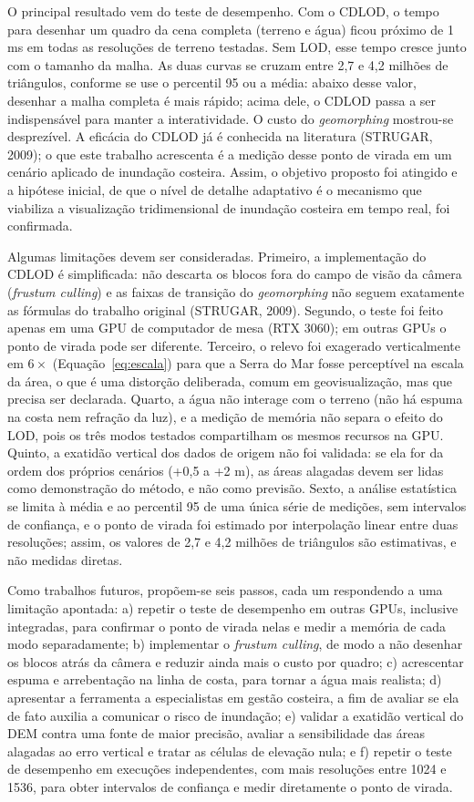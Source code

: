\documentclass[conference]{IEEEtran}
\begin{document}
O principal resultado vem do teste de desempenho. Com o CDLOD, o tempo para
desenhar um quadro da cena completa (terreno e água) ficou próximo de 1 ms
em todas as resoluções de terreno testadas. Sem LOD, esse tempo cresce
junto com o tamanho da malha. As duas curvas se cruzam entre 2,7 e 4,2
milhões de triângulos, conforme se use o percentil 95 ou a média: abaixo
desse valor, desenhar a malha completa é mais rápido; acima dele, o CDLOD
passa a ser indispensável para manter a interatividade. O custo do \emph{geomorphing} mostrou-se
desprezível. A eficácia do CDLOD já é conhecida na literatura (STRUGAR,
2009); o que este trabalho acrescenta é a medição desse ponto de virada em
um cenário aplicado de inundação costeira. Assim, o objetivo proposto foi
atingido e a hipótese inicial, de que o nível de detalhe adaptativo é o
mecanismo que viabiliza a visualização tridimensional de inundação costeira
em tempo real, foi confirmada.

Algumas limitações devem ser consideradas. Primeiro, a implementação do
CDLOD é simplificada: não descarta os blocos fora do campo de visão da
câmera (\emph{frustum culling}) e as faixas de transição do
\emph{geomorphing} não seguem exatamente as fórmulas do trabalho original
(STRUGAR, 2009). Segundo, o teste foi feito apenas em uma GPU de computador
de mesa (RTX 3060); em outras GPUs o ponto de virada pode ser diferente. Terceiro, o relevo foi exagerado verticalmente em $6\times$
(Equação~\eqref{eq:escala}) para que a Serra do Mar fosse perceptível na
escala da área, o que é uma distorção deliberada, comum em geovisualização,
mas que precisa ser declarada. Quarto, a água não interage com o terreno
(não há espuma na costa nem refração da luz), e a medição de memória não
separa o efeito do LOD, pois os três modos testados compartilham os mesmos
recursos na GPU. Quinto, a exatidão vertical dos dados de origem não foi
validada: se ela for da ordem dos próprios cenários (+0,5 a +2 m), as áreas
alagadas devem ser lidas como demonstração do método, e não como previsão.
Sexto, a análise estatística se limita à média e ao percentil 95 de uma única
série de medições, sem intervalos de confiança, e o ponto de virada foi
estimado por interpolação linear entre duas resoluções; assim, os valores de
2,7 e 4,2 milhões de triângulos são estimativas, e não medidas diretas.

Como trabalhos futuros, propõem-se seis passos, cada um respondendo a uma
limitação apontada: a) repetir o teste de desempenho em outras GPUs, inclusive integradas, para confirmar o ponto de virada nelas e
medir a memória de cada modo separadamente; b) implementar o
\emph{frustum culling}, de modo a não desenhar os blocos atrás da câmera e
reduzir ainda mais o custo por quadro; c) acrescentar espuma e arrebentação
na linha de costa, para tornar a água mais realista; d) apresentar a
ferramenta a especialistas em gestão costeira, a fim de avaliar se ela de
fato auxilia a comunicar o risco de inundação; e) validar a exatidão
vertical do DEM contra uma fonte de maior precisão, avaliar a sensibilidade
das áreas alagadas ao erro vertical e tratar as células de elevação nula; e
f) repetir o teste de desempenho em execuções independentes, com mais
resoluções entre 1024 e 1536, para obter intervalos de confiança e medir
diretamente o ponto de virada.
\end{document}
